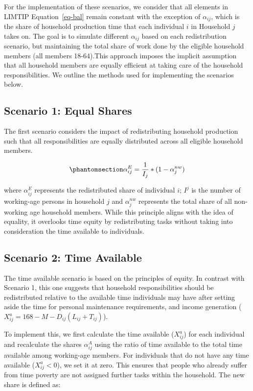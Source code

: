 \documentclass[
  11pt,
]{article}
\begin{document}
For the implementation of these scenarios, we consider that all elements
in LIMTIP Equation~\ref{eq-bal} remain constant with the exception of
\(\alpha_{ij}\), which is the share of household production time that
each individual \(i\) in Household \(j\) takes on. The goal is to
simulate different \(\alpha_{ij}\) based on each redistribution
scenario, but maintaining the total share of work done by the eligible
household members (all members 18-64).This approach imposes the implicit
assumption that all household members are equally efficient at taking
care of the household responsibilities. We outline the methods used for
implementing the scenarios below.

\subsection{Scenario 1: Equal Shares}\label{scenario-1-equal-shares}

The first scenario considers the impact of redistributing household
production such that all responsibilities are equally distributed across
all eligible household members.

\begin{equation}\phantomsection\label{eq-r1}{\alpha_{ij}^E= \frac{1}{I_j}*(1-\alpha_{j}^{nw})
}\end{equation}

where \(\alpha_{ij}^E\) represents the redistributed share of individual
\(i\); \(I^j\) is the number of working-age persons in household \(j\)
and \(\alpha_{j}^{nw}\) represents the total share of all non-working
age household members. While this principle aligns with the idea of
equality, it overlooks time equity by redistributing tasks without
taking into consideration the time available to individuals.

\subsection{Scenario 2: Time Available}\label{scenario-2-time-available}

The time available scenario is based on the principles of equity. In
contrast with Scenario 1, this one suggests that household
responsibilities should be redistributed relative to the available time
individuals may have after setting aside the time for personal
maintenance requirements, and income generation
(\(X^a_{ij}=168-M-D_{ij}(L_{ij}+T_{ij})\)).

To implement this, we first calculate the time available (\(X^a_{ij}\))
for each individual and recalculate the shares \(\alpha_{ij}^A\) using
the ratio of time available to the total time available among
working-age members. For individuals that do not have any time available
(\(X^a_{ij}<0\)), we set it at zero. This ensures that people who
already suffer from time poverty are not assigned further tasks within
the household. The new share is defined as:
\end{document}
